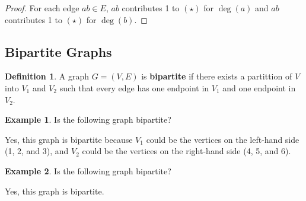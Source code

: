 \documentclass[]{article}
\theoremstyle{definition}
\newtheorem*{defn}{Definition}
\newtheorem{ex}{Example}[section]
\begin{document}
			\begin{proof}
				For each edge $ab \in E$, $ab$ contributes 1 to $(\star)$ for $\deg(a)$ and $ab$ contributes 1 to $(\star)$ for $\deg(b)$.
			\end{proof}

		\subsection{Bipartite Graphs}
			\begin{defn}
				A graph $G = (V, E)$ is \textbf{bipartite} if there exists a partittion of $V$ into $V_1$ and $V_2$ such that every edge has one endpoint in $V_1$ and one endpoint in $V_2$.
			\end{defn}

			\begin{ex}
				Is the following graph bipartite?
				\begin{center}
				\end{center}
				Yes, this graph is bipartite because $V_1$ could be the vertices on the left-hand side (1, 2, and 3), and $V_2$ could be the vertices on the right-hand side (4, 5, and 6).
			\end{ex}

			\begin{ex}
				Is the following graph bipartite?
				\begin{center}
				\end{center}
				Yes, this graph is bipartite.
			\end{ex}
\end{document}
